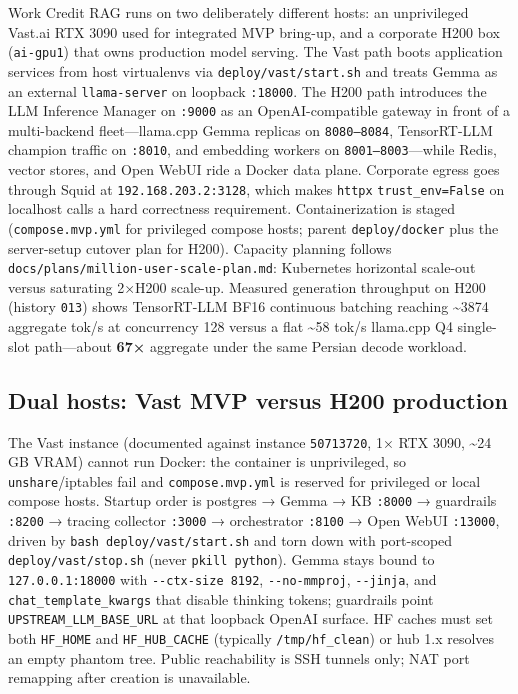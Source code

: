 \documentclass[
  11pt,
]{article}
\begin{document}
Work Credit RAG runs on two deliberately different hosts: an
unprivileged Vast.ai RTX 3090 used for integrated MVP bring-up, and a
corporate H200 box (\texttt{ai-gpu1}) that owns production model
serving. The Vast path boots application services from host virtualenvs
via \texttt{deploy/vast/start.sh} and treats Gemma as an external
\texttt{llama-server} on loopback \texttt{:18000}. The H200 path
introduces the LLM Inference Manager on \texttt{:9000} as an
OpenAI-compatible gateway in front of a multi-backend fleet---llama.cpp
Gemma replicas on \texttt{8080–8084}, TensorRT-LLM champion traffic on
\texttt{:8010}, and embedding workers on \texttt{8001–8003}---while
Redis, vector stores, and Open WebUI ride a Docker data plane. Corporate
egress goes through Squid at \texttt{192.168.203.2:3128}, which makes
\texttt{httpx} \texttt{trust\_env=False} on localhost calls a hard
correctness requirement. Containerization is staged
(\texttt{compose.mvp.yml} for privileged compose hosts; parent
\texttt{deploy/docker} plus the server-setup cutover plan for H200).
Capacity planning follows
\texttt{docs/plans/million-user-scale-plan.md}: Kubernetes horizontal
scale-out versus saturating 2×H200 scale-up. Measured generation
throughput on H200 (history \texttt{013}) shows TensorRT-LLM BF16
continuous batching reaching \textasciitilde3874 aggregate tok/s at
concurrency 128 versus a flat \textasciitilde58 tok/s llama.cpp Q4
single-slot path---about \textbf{67×} aggregate under the same Persian
decode workload.

\subsection{Dual hosts: Vast MVP versus H200
production}\label{dual-hosts-vast-mvp-versus-h200-production}

The Vast instance (documented against instance \texttt{50713720}, 1× RTX
3090, \textasciitilde24 GB VRAM) cannot run Docker: the container is
unprivileged, so \texttt{unshare}/iptables fail and
\texttt{compose.mvp.yml} is reserved for privileged or local compose
hosts. Startup order is postgres → Gemma → KB \texttt{:8000} →
guardrails \texttt{:8200} → tracing collector \texttt{:3000} →
orchestrator \texttt{:8100} → Open WebUI \texttt{:13000}, driven by
\texttt{bash\ deploy/vast/start.sh} and torn down with port-scoped
\texttt{deploy/vast/stop.sh} (never \texttt{pkill\ python}). Gemma stays
bound to \texttt{127.0.0.1:18000} with \texttt{-\/-ctx-size\ 8192},
\texttt{-\/-no-mmproj}, \texttt{-\/-jinja}, and
\texttt{chat\_template\_kwargs} that disable thinking tokens; guardrails
point \texttt{UPSTREAM\_LLM\_BASE\_URL} at that loopback OpenAI surface.
HF caches must set both \texttt{HF\_HOME} and \texttt{HF\_HUB\_CACHE}
(typically \texttt{/tmp/hf\_clean}) or hub 1.x resolves an empty phantom
tree. Public reachability is SSH tunnels only; NAT port remapping after
creation is unavailable.
\end{document}
